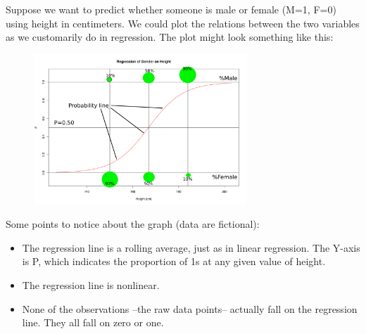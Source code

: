 \begin{frame}
  Suppose we want to predict whether someone is male or female (M=1, F=0) using height in centimeters. We could plot the relations between the two variables as we customarily do in regression. The plot might look something like this:
  \begin{figure}
    \centering
    \includegraphics[width=8cm,bb=0 0 841 595]{./../images/logistic.png}
  \end{figure}
\end{frame}

\begin{frame}
  \vspace{.5cm}
  Some points to notice about the graph (data are fictional):
  \begin{itemize}
    \vspace{.35cm}
    \item The regression line is a rolling average, just as in linear regression. The Y-axis is P, which indicates the proportion of 1s at any given value of height. 
    \vspace{.35cm}
    \item The regression line is nonlinear. 
    \vspace{.35cm}
    \item None of the observations --the raw data points-- actually fall on the regression line. They all fall on zero or one. 
  \end{itemize}
\end{frame}

